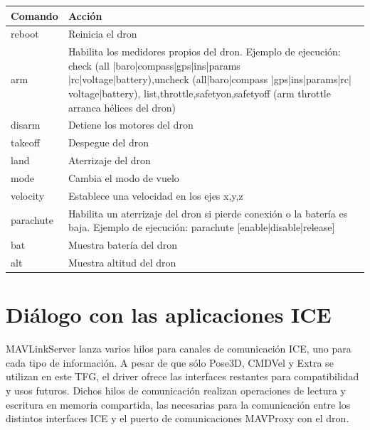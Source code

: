 \begin{center}
  \label{comandos}
  \begin{tabular}{ | l | p{10cm} |}
  \hline
  \textbf{Comando} & \textbf{Acción} \\ \hline
  reboot& Reinicia el dron\\ \hline
  arm & Habilita los medidores propios del dron. Ejemplo de ejecución: check (all |baro|compass|gps|ins|params |rc|voltage|battery),uncheck (all|baro|compass |gps|ins|params|rc| voltage|battery), list,throttle,safetyon,safetyoff (arm throttle arranca hélices del dron)\\ \hline
  disarm& Detiene los motores del dron \\ \hline
  takeoff& Despegue del dron\\ \hline
  land&Aterrizaje del dron \\ \hline
  mode& Cambia el modo de vuelo\\ \hline
  velocity& Establece una velocidad en los ejes x,y,z\\ \hline
  parachute& Habilita un aterrizaje del dron si pierde conexión o la batería es baja. Ejemplo de ejecución: parachute [enable|disable|release]\\ \hline
  bat& Muestra batería del dron\\ \hline
  alt& Muestra altitud del dron\\ \hline
  \end{tabular}
\end{center}


























\section{Diálogo con las aplicaciones ICE}

MAVLinkServer lanza varios hilos para canales de comunicación ICE, uno para cada tipo de información. A pesar de que sólo Pose3D, CMDVel y Extra se utilizan en este TFG, el driver ofrece las interfaces restantes para compatibilidad y usos futuros. Dichos hilos de comunicación realizan operaciones de lectura y escritura en memoria compartida, las necesarias para la comunicación entre los distintos interfaces ICE y el puerto de comunicaciones MAVProxy con el dron.

